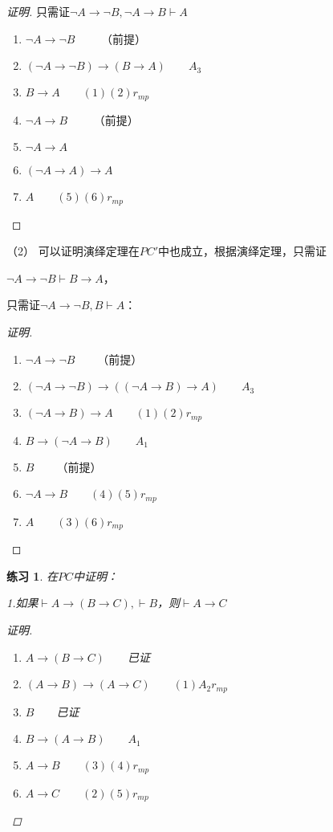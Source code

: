 \documentclass{article}
\newtheorem{Exercise}{练习}
\begin{document}
\begin{CJK*}{UTF8}{gbsn}
\begin{proof}[证明]
  只需证$\lnot A\to \lnot B,\lnot A\to B\vdash A$

  \begin{enumerate}
    \item $\lnot A\to \lnot B\qquad$ （前提）
    \item $(\lnot A\to \lnot B)\to (B\to A)\qquad A_3$
    \item $B\to A\qquad (1)(2)r_{mp}$
    \item $\lnot A\to B\qquad$ （前提）
    \item $\lnot A\to A$
    \item $(\lnot A\to A)\to A$
    \item $A\qquad (5)(6)r_{mp}$
  \end{enumerate}
\end{proof}
（2）
可以证明演绎定理在$PC'$中也成立，根据演绎定理，只需证

$\lnot A\to \lnot B\vdash B\to A$，

只需证$\lnot A\to \lnot B, B\vdash A$：
\begin{proof}[证明]

  $\quad$

  \begin{enumerate}
    \item $\lnot A\to \lnot B\qquad$（前提）
    \item $(\lnot A\to \lnot B)\to ((\lnot A\to B)\to A)\qquad A_3$
    \item $(\lnot A\to B)\to A\qquad (1)(2)r_{mp}$
    \item $B\to (\lnot A \to B)\qquad A_1$
    \item $B\qquad$（前提）
    \item $\lnot A \to B\qquad (4)(5)r_{mp}$
    \item $A\qquad (3)(6)r_{mp}$
  \end{enumerate}
\end{proof}
\begin{Exercise}
  在$PC$中证明：

  1.如果$\vdash A\to (B\to C),\vdash B$，则$\vdash A\to C$

  \begin{proof}[证明]
    $\quad$
    \begin{enumerate}
      \item $A\to (B\to C)\qquad$已证
      \item $(A\to B)\to (A\to C)\qquad (1)A_2r_{mp}$
      \item $B\qquad$已证
      \item $B\to (A\to B)\qquad A_1$
      \item $A\to B\qquad (3)(4)r_{mp}$
      \item $A\to C\qquad(2)(5)r_{mp}$
    \end{enumerate}
  \end{proof}


\end{Exercise}
\end{CJK*}
\end{document}
